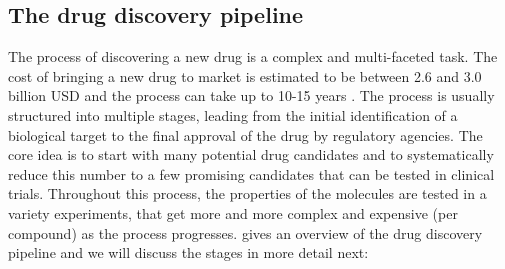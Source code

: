 \subsection{The drug discovery pipeline}
The process of discovering a new drug is a complex and multi-faceted task. The
cost of bringing a new drug to market is estimated to be between 2.6 and 3.0
billion USD \citep{todo} and the process can take up to 10-15 years
\citep{todo}. The process is usually structured into multiple stages,
leading from the initial identification of a biological target to the final
approval of the drug by regulatory agencies. The core idea is to start 
with many potential drug candidates and to systematically reduce this number
to a few promising candidates that can be tested in clinical trials.
Throughout this process, the properties of the molecules are tested in a
variety experiments, that get more and more complex and expensive (per compound) as the
process progresses.  gives an overview of the
drug discovery pipeline and we will discuss the stages in more detail next:

